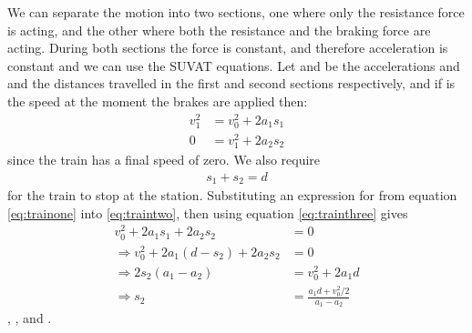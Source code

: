 \begin{problem}
{%
We can separate the motion into two sections, one where only the resistance force is acting, and the other where both the resistance and the braking force are acting. During both sections the force is constant, and therefore acceleration is constant and we can use the SUVAT equations. Let  and  be the accelerations and  and  the distances travelled in the first and second sections respectively, and if  is the speed at the moment the brakes are applied then:
\begin{align}
v_1^2&=v_0^2+2a_1s_1 \label{eq:trainone} \\
0&=v_1^2+2a_2s_2 \label{eq:traintwo}
\end{align}
since the train has a final speed of zero. We also require
\begin{align}
s_1+s_2=d \label{eq:trainthree}
\end{align}
for the train to stop at the station. Substituting an expression for  from equation \eqref{eq:trainone} into \eqref{eq:traintwo}, then using equation \eqref{eq:trainthree} gives
\begin{align*}
v_0^2+2a_1s_1+2a_2s_2&=0 \\
\Rightarrow v_0^2+2a_1(d-s_2)+2a_2s_2&=0 \\
\Rightarrow 2s_2(a_1-a_2)&=v_0^2+2a_1d \\
\Rightarrow s_2&=\frac{a_1d+v_0^2/2}{a_1-a_2}
\end{align*}
, ,  and . 
}
\end{problem}